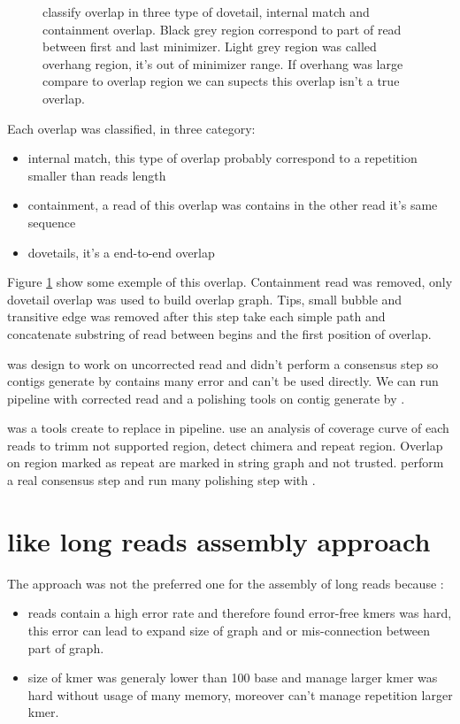 \documentclass[main]{subfiles}
\begin{document}
\begin{figure}[ht]
    \centering
    
    \caption{\miniasm classify overlap in three type of dovetail, internal match and containment overlap. Black grey region correspond to part of read between first and last minimizer. Light grey region was called overhang region, it's out of minimizer range. If overhang was large compare to overlap region we can supects this overlap isn't a true overlap.}
    \label{sota:fig:miniasm:ovl_classification}
\end{figure}

Each overlap was classified, in three category:
\begin{itemize}
    \item internal match, this type of overlap probably correspond to a repetition smaller than reads length
    \item containment, a read of this overlap was contains in the other read it's same sequence
    \item dovetails, it's a end-to-end overlap
\end{itemize}
Figure \ref{sota:fig:miniasm:ovl_classification} show some exemple of this overlap. Containment read was removed, only dovetail overlap was used to build overlap graph. Tips, small bubble and transitive edge was removed after this step \miniasm take each simple path and concatenate substring of read between begins and the first position of overlap.

\miniasm was design to work on uncorrected read and didn't perform a consensus step so contigs generate by \miniasm contains many error and can't be used directly. We can run \minimap \miniasm pipeline with corrected read and a polishing tools on contig generate by \miniasm. 

\cite{Ra} was a tools create to replace \miniasm in \minimap \miniasm pipeline.  use an analysis of coverage curve of each reads to trimm not supported region, detect chimera and repeat region. Overlap on region marked as repeat are marked in string graph and not trusted.  perform a real consensus step and run many polishing step with .

\section{\DBG like long reads assembly approach} \label{section:sota:wtdbg}

The \DBG approach was not the preferred one for the assembly of long reads because :
\begin{itemize}
    \item reads contain a high error rate and therefore found error-free kmers was hard, this error can lead to expand size of graph and or mis-connection between part of graph.
    \item size of kmer was generaly lower than 100 base and manage larger kmer was hard without usage of many memory, moreover \DBG can't manage repetition larger kmer.
\end{itemize}
\end{document}
